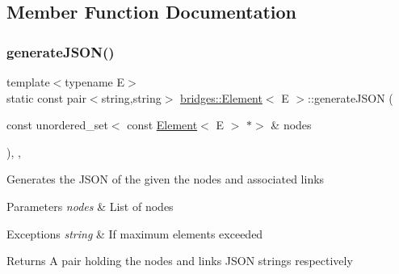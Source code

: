 \subsection{Member Function Documentation}
\hypertarget{classbridges_1_1_element_ab1213565f8b6fa9a62a101d507ff5127}{}\label{classbridges_1_1_element_ab1213565f8b6fa9a62a101d507ff5127} 
\subsubsection{\texorpdfstring{generate\+J\+S\+O\+N()}{generateJSON()}}
{\footnotesize\ttfamily template$<$typename E$>$ \\
static const pair$<$string,string$>$ \hyperlink{classbridges_1_1_element}{bridges\+::\+Element}$<$ E $>$\+::generate\+J\+S\+ON (\begin{DoxyParamCaption}\item[{const unordered\+\_\+set$<$ const \hyperlink{classbridges_1_1_element}{Element}$<$ E $>$ $\ast$$>$ \&}]{nodes }\end{DoxyParamCaption})\hspace{0.3cm}{\ttfamily [inline]}, {\ttfamily [static]}, {\ttfamily [protected]}}

Generates the J\+S\+ON of the given the nodes and associated links


\begin{DoxyParams}{Parameters}
{\em nodes} & List of nodes \\
\hline
\end{DoxyParams}

\begin{DoxyExceptions}{Exceptions}
{\em string} & If maximum elements exceeded \\
\hline
\end{DoxyExceptions}
\begin{DoxyReturn}{Returns}
A pair holding the nodes and links J\+S\+ON strings respectively 
\end{DoxyReturn}
\hypertarget{classbridges_1_1_element_aac0166f66a2d9e551ba318e088649d0b}{}\label{classbridges_1_1_element_aac0166f66a2d9e551ba318e088649d0b} 
